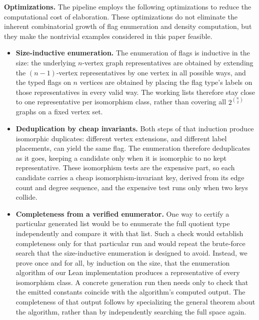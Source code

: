 \documentclass{article}
\begin{document}
\medskip
\noindent\textbf{Optimizations.}
The pipeline employs the following optimizations to reduce the computational
cost of elaboration.  These optimizations do not eliminate the inherent
combinatorial growth of flag enumeration and density computation, but they
make the nontrivial examples considered in this paper feasible.

\begin{itemize}
\item \textbf{Size-inductive enumeration.}
The enumeration of flags is inductive in the size: the underlying
\(n\)-vertex graph representatives are obtained by extending the
\((n-1)\)-vertex representatives by one vertex in all possible ways, and the
typed flags on \(n\) vertices are obtained by placing the flag type's labels on
those representatives in every valid way.  The working lists therefore stay
close to one representative per isomorphism class, rather than covering all
\(2^{\binom{n}{2}}\) graphs on a fixed vertex set.

\item \textbf{Deduplication by cheap invariants.}
Both steps of that induction produce isomorphic duplicates: different vertex
extensions, and different label placements, can yield the same flag.  The
enumeration therefore deduplicates as it goes, keeping a candidate only when
it is isomorphic to no kept representative.  These isomorphism tests are the
expensive part, so each candidate carries a cheap isomorphism-invariant key,
derived from its edge count and degree sequence, and the expensive test runs
only when two keys collide.

\item \textbf{Completeness from a verified enumerator.}
One way to certify a particular generated list would be to enumerate the full
quotient type independently and compare it with that list.  Such a check would
establish completeness only for that particular run and would repeat the
brute-force search that the size-inductive enumeration is designed to avoid.
Instead, we prove once and for all, by induction on the size, that the
enumeration algorithm of our Lean implementation produces a representative of every isomorphism class.
A concrete generation run then needs only to check that the emitted constants
coincide with the algorithm's computed output.  The completeness of that
output follows by specializing the general theorem about the algorithm, rather
than by independently searching the full space again.


\end{itemize}
\end{document}
